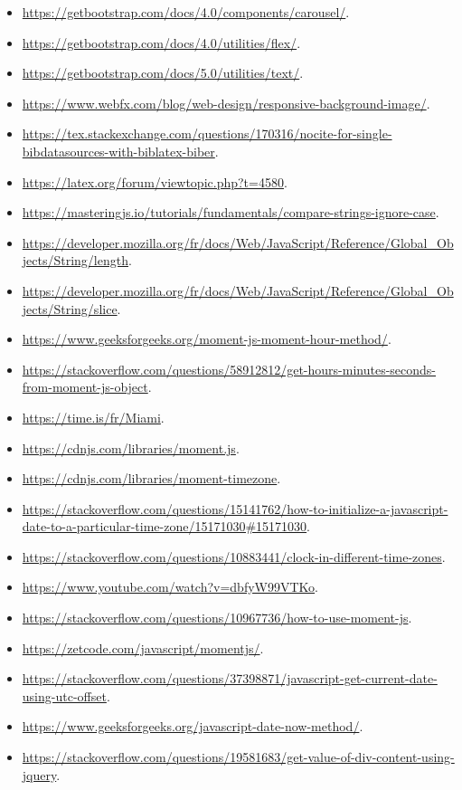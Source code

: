 \begin{itemize}
    \item \url{https://getbootstrap.com/docs/4.0/components/carousel/}.
    \item \url{https://getbootstrap.com/docs/4.0/utilities/flex/}.
    \item \url{https://getbootstrap.com/docs/5.0/utilities/text/}.
    \item \url{https://www.webfx.com/blog/web-design/responsive-background-image/}.
    \item \url{https://tex.stackexchange.com/questions/170316/nocite-for-single-bibdatasources-with-biblatex-biber}.
    \item \url{https://latex.org/forum/viewtopic.php?t=4580}.
    \item \url{https://masteringjs.io/tutorials/fundamentals/compare-strings-ignore-case}.
    \item \url{https://developer.mozilla.org/fr/docs/Web/JavaScript/Reference/Global_Objects/String/length}.
    \item \url{https://developer.mozilla.org/fr/docs/Web/JavaScript/Reference/Global_Objects/String/slice}.
    \item \url{https://www.geeksforgeeks.org/moment-js-moment-hour-method/}.
    \item \url{https://stackoverflow.com/questions/58912812/get-hours-minutes-seconds-from-moment-js-object}.
    \item \url{https://time.is/fr/Miami}.
    \item \url{https://cdnjs.com/libraries/moment.js}.
    \item \url{https://cdnjs.com/libraries/moment-timezone}.
    \item \url{https://stackoverflow.com/questions/15141762/how-to-initialize-a-javascript-date-to-a-particular-time-zone/15171030#15171030}.
    \item \url{https://stackoverflow.com/questions/10883441/clock-in-different-time-zones}.
    \item \url{https://www.youtube.com/watch?v=dbfyW99VTKo}.
    \item \url{https://stackoverflow.com/questions/10967736/how-to-use-moment-js}.
    \item \url{https://zetcode.com/javascript/momentjs/}.
    \item \url{https://stackoverflow.com/questions/37398871/javascript-get-current-date-using-utc-offset}.
    \item \url{https://www.geeksforgeeks.org/javascript-date-now-method/}.
    \item \url{https://stackoverflow.com/questions/19581683/get-value-of-div-content-using-jquery}.

\end{itemize}
